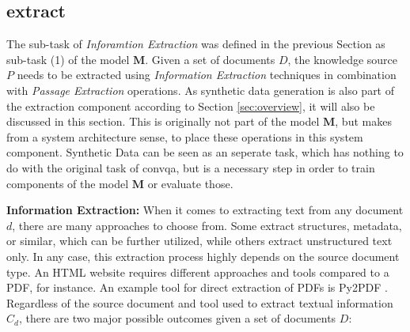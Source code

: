 


\subsection{extract}
\label{subsec:extract}

The sub-task of \textit{Inforamtion Extraction} was defined in the previous Section as sub-task (1) of the model $\mathbf{M}$. Given a set of documents $D$, the knowledge source $P$ needs to be extracted using \textit{Information Extraction} techniques in combination with \textit{Passage Extraction} operations. As synthetic data generation is also part of the extraction component according to Section \ref{sec:overview}, it will also be discussed in this section. This is originally not part of the model $\mathbf{M}$, but makes from a system architecture sense, to place these operations in this system component. Synthetic Data can be seen as an seperate task, which has nothing to do with the original task of \gls{convqa}, but is a necessary step in order to train components of the model $\mathbf{M}$ or evaluate those.

\vspace{\baselineskip} %

\textbf{Information Extraction:} When it comes to extracting text from any document $d$, there are many approaches to choose from. Some extract structures, metadata, or similar, which can be further utilized, while others extract unstructured text only. In any case, this extraction process highly depends on the source document type. An HTML website requires different approaches and tools compared to a PDF, for instance. An example tool for direct extraction of PDFs is Py2PDF \cite{noauthor_welcome_nodate}. Regardless of the source document and tool used to extract textual information $C_d$, there are two major possible outcomes given a set of documents $D$:

